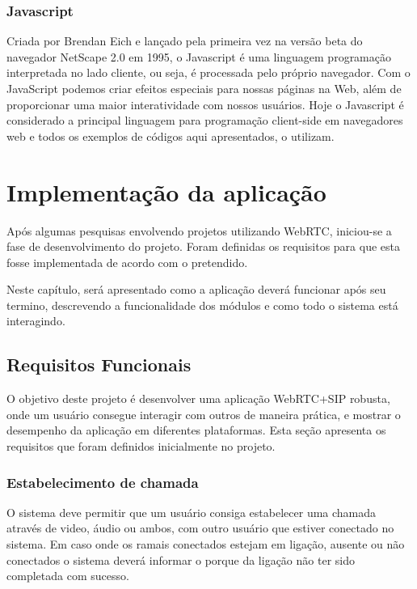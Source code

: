 \documentclass[12pt,a4paper,oneside]{report}
\begin{document}
\subsection{Javascript}
\label{ss_javascript}
Criada por Brendan Eich e lançado pela primeira vez na versão beta do navegador NetScape 2.0 em 1995, o Javascript é uma linguagem programação interpretada no lado cliente, ou seja, é processada pelo próprio navegador. Com o JavaScript podemos criar efeitos especiais para nossas páginas na Web, além de proporcionar uma maior interatividade com nossos usuários. \cite{JAVASCRIPT}
Hoje o Javascript é considerado a principal linguagem para programação client-side em navegadores web e todos os exemplos de códigos aqui apresentados, o utilizam. 

\chapter{Implementação da aplicação} %
\label{c_bibliografia} %
Após algumas pesquisas envolvendo projetos utilizando WebRTC, iniciou-se a fase de desenvolvimento do projeto. Foram definidas os requisitos para que esta fosse implementada de acordo com o pretendido.

Neste capítulo, será apresentado como a aplicação deverá funcionar após seu termino, descrevendo a funcionalidade dos módulos e como todo o sistema está interagindo. 

\section{Requisitos Funcionais}
O objetivo deste projeto é desenvolver uma aplicação WebRTC+SIP robusta, onde um usuário consegue interagir com outros de maneira prática, e mostrar o desempenho da aplicação em diferentes plataformas. Esta seção apresenta os requisitos que foram definidos inicialmente no projeto. 

\subsection{Estabelecimento de chamada}
O sistema deve permitir que um usuário consiga estabelecer uma chamada através de video, áudio ou ambos, com outro usuário que estiver conectado no sistema. Em caso onde os ramais conectados estejam em ligação, ausente ou não conectados o sistema deverá informar o porque da ligação não ter sido completada com sucesso.
\end{document}
